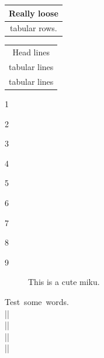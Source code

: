 \documentclass[UTF8]{ctexart}
\begin{document}
	\renewcommand\arraystretch{1.8}
	\begin{tabular}{|c|}
		\hline
		Really loose \\ \hline
		tabular rows. \\ \hline
	\end{tabular}


	\begin{tabular}{c}
		\hline
		Head lines \\[6pt]
		tabular lines \\
		tabular lines \\ \hline
	\end{tabular}

	1

	2

	3

	4

	5

	6

	7

	8

	9

	\begin{figure}[htb]
		\caption{This is a cute miku.}
		\label{fig}
	\end{figure}


	\mbox{Test some words.}\\
	||\\
	||\\
	||\\
	||
\end{document}
